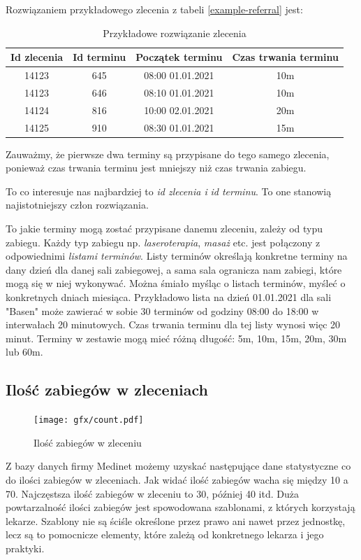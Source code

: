 Rozwiązaniem przykładowego zlecenia z tabeli \ref{example-referral}
jest:

\begin{table}[h]
	\centering
	\begin{tabular}{ | c | c | c | c | }
		\hline
	\bfseries Id zlecenia & \bfseries Id terminu & \bfseries Początek terminu & \bfseries Czas trwania terminu \\
	\hline
	14123 & 645 & 08:00 01.01.2021 & 10m \\
	\hline
	14123 & 646 & 08:10 01.01.2021 & 10m \\
	\hline
	14124 & 816 & 10:00 02.01.2021 & 20m \\
	\hline
	14125 & 910 & 08:30 01.01.2021 & 15m \\
	\hline
	\end{tabular}
	\caption{Przykładowe rozwiązanie zlecenia}
	\label{example-solution}
\end{table}

Zauważmy, że pierwsze dwa terminy są przypisane do tego samego zlecenia,
ponieważ czas trwania terminu jest mniejszy niż czas trwania zabiegu.

To co interesuje nas najbardziej to \emph{id zlecenia i} \emph{id terminu}. To
one stanowią najistotniejszy człon rozwiązania.

To jakie terminy mogą zostać przypisane danemu zleceniu,
zależy od typu zabiegu. Każdy typ zabiegu np. \emph{laseroterapia}, \emph{masaż} etc. jest
połączony z odpowiednimi \emph{listami terminów}. Listy terminów określają
konkretne terminy na dany dzień dla danej sali zabiegowej, a sama sala
ogranicza nam zabiegi, które mogą się w niej wykonywać. Można śmiało myśląc o
listach terminów, myśleć o konkretnych dniach miesiąca. Przykładowo lista na
dzień 01.01.2021 dla sali "Basen" może zawierać w sobie 30 terminów od godziny 08:00
do 18:00 w interwałach 20 minutowych. Czas trwania terminu dla tej listy wynosi
więc 20 minut. Terminy w zestawie mogą mieć różną długość: 5m, 10m, 15m, 20m, 30m
lub 60m. %
\newpage
\subsection{Ilość zabiegów w zleceniach}
\begin{figure}[h]
	\centering
	\texttt{[image: gfx/count.pdf]}
	\caption{Ilość zabiegów w zleceniu}
	\label{medinet-treatments-stats}
\end{figure}
Z bazy danych firmy Medinet możemy uzyskać następujące dane statystyczne co do
ilości zabiegów w zleceniach. Jak widać ilość zabiegów wacha się między 10 a 70.
Najczęstsza ilość zabiegów w zleceniu to 30, później 40 itd. Duża powtarzalność
ilości zabiegów jest spowodowana szablonami, z których korzystają lekarze.
Szablony nie są ściśle określone przez prawo ani nawet przez jednostkę, lecz są
to pomocnicze elementy, które zależą od konkretnego lekarza i jego praktyki.
\newpage
